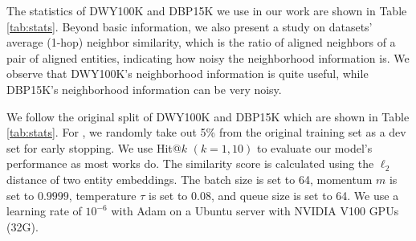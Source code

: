 
The statistics of DWY100K and DBP15K we use in our work are shown in Table \ref{tab:stats}. 
Beyond basic information, we also present a study on datasets' average (1-hop) neighbor similarity, which is the ratio of aligned neighbors of a pair of aligned entities, indicating how noisy the neighborhood information is.
We observe that DWY100K's neighborhood information is quite useful, while DBP15K's neighborhood information can be very noisy.

We follow the original split of DWY100K \cite{sun2018bootstrapping} and DBP15K \cite{JAPE} which are shown in Table \ref{tab:stats}. 
For \solution, we randomly take out 5\% from the original training set as a dev set for early stopping. 
We use Hit@$k$ $(k=1, 10)$ to evaluate our model's performance as most works do. 
The similarity score is calculated using the $\ell_2$ distance of two entity embeddings. The batch size is set to 64, momentum $m$ is set to $0.9999$, temperature $\tau$ is set to $0.08$, and queue size is set to 64. We use a learning rate of $10^{-6}$ with Adam on a Ubuntu server with NVIDIA V100 GPUs (32G).


